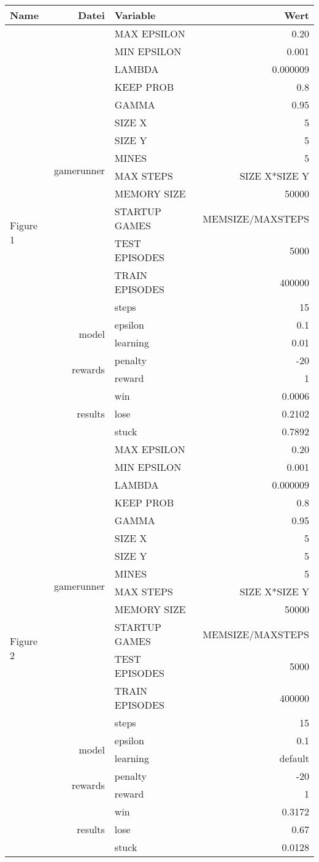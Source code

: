 \documentclass[9pt]{article}
\begin{document}
\begin{tabularx}{\textwidth}{l|r|X|r}
Name & Datei & Variable & Wert \\
\hline
\multirow{21}{*}{Figure 1} & \multirow{14}{*}{gamerunner} & MAX EPSILON	& 0.20\\
& & MIN EPSILON	& 0.001 \\
& & LAMBDA & 0.000009 \\
& & KEEP PROB & 0.8 \\
& & GAMMA	& 0.95 \\
& & SIZE X & 5 \\
& & SIZE Y & 5 \\
& & MINES & 5 \\
& & MAX STEPS & SIZE X*SIZE Y\\
& & MEMORY SIZE & 50000 \\
& & STARTUP GAMES & MEMSIZE/MAXSTEPS \\
& & TEST EPISODES & 5000 \\
& & TRAIN EPISODES & 400000 \\
& & steps & 15\\\cline{2-4}
& \multirow{2}{*}{model} & epsilon & 0.1\\
& & learning & 0.01 \\\cline{2-4}
& \multirow{2}{*}{rewards} & penalty &-20\\
& & reward& 1\\\cline{2-4}
& \multirow{3}{*}{results} & win & 0.0006\\
& & lose &0.2102\\
& & stuck &0.7892\\
\hline
\hline
\multirow{21}{*}{Figure 2} & \multirow{14}{*}{gamerunner} & MAX EPSILON	& 0.20\\
& & MIN EPSILON	& 0.001 \\
& & LAMBDA & 0.000009 \\
& & KEEP PROB & 0.8 \\
& & GAMMA	& 0.95 \\
& & SIZE X & 5 \\
& & SIZE Y & 5 \\
& & MINES & 5 \\
& & MAX STEPS & SIZE X*SIZE Y\\
& & MEMORY SIZE & 50000 \\
& & STARTUP GAMES & MEMSIZE/MAXSTEPS \\
& & TEST EPISODES & 5000 \\
& & TRAIN EPISODES & 400000 \\
& & steps & 15\\\cline{2-4}
& \multirow{2}{*}{model} & epsilon & 0.1\\
& & learning & default \\\cline{2-4}
& \multirow{2}{*}{rewards} & penalty	&-20\\
& & reward& 1\\\cline{2-4}
& \multirow{3}{*}{results} & win & 0.3172\\
& & lose & 0.67\\
& & stuck & 0.0128\\
\hline
\end{tabularx}
\end{document}
